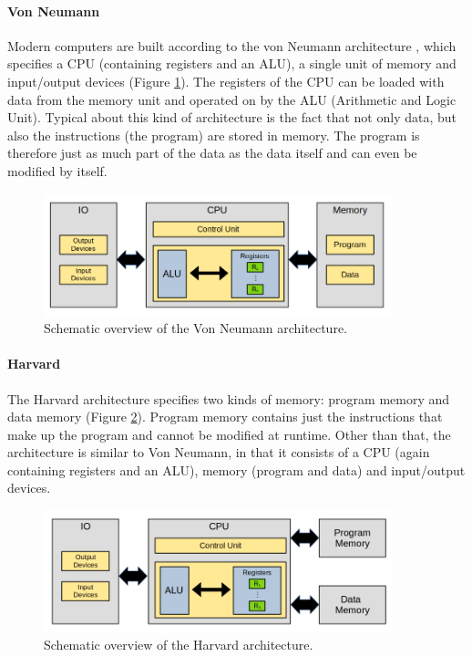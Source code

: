 \paragraph{Von Neumann} Modern computers are built according to the von Neumann architecture \cite{vonneumann-wiki}, which specifies a CPU (containing registers and an ALU), a single unit of memory and input/output devices (Figure \ref{fig:vonneumann}). The registers of the CPU can be loaded with data from the memory unit and operated on by the ALU (Arithmetic and Logic Unit). Typical about this kind of architecture is the fact that not only data, but also the instructions (the program) are stored in memory. The program is therefore just as much part of the data as the data itself and can even be modified by itself.
\begin{figure}[H]
  \centering
  \includegraphics[width=0.9\textwidth]{img/vonneumann}
  \caption{Schematic overview of the Von Neumann architecture.}
  \label{fig:vonneumann}
\end{figure}

\paragraph{Harvard} The Harvard architecture specifies two kinds of memory: program memory and data memory (Figure \ref{fig:harvard}). Program memory contains just the instructions that make up the program and cannot be modified at runtime. Other than that, the architecture is similar to Von Neumann, in that it consists of a CPU (again containing registers and an ALU), memory (program and data) and input/output devices.
\begin{figure}[H]
  \centering
  \includegraphics[width=0.9\textwidth]{img/harvard}
  \caption{Schematic overview of the Harvard architecture.}
  \label{fig:harvard}
\end{figure}

